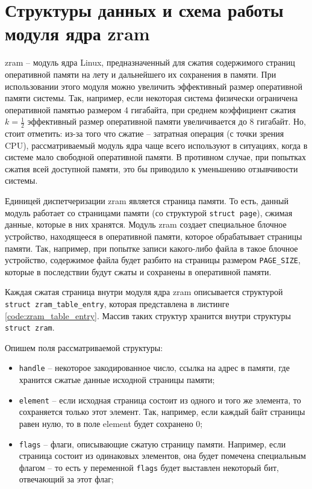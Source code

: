\documentclass[12pt, a4paper]{article}
\begin{document}
\section{Структуры данных и схема работы модуля ядра zram}

zram -- модуль ядра Linux, предназначенный для сжатия содержимого страниц оперативной памяти на лету и дальнейшего их сохранения в памяти. При использовании этого модуля можно увеличить эффективный размер оперативной памяти системы. Так, например, если некоторая система физически ограничена оперативной памятью размером 4 гигабайта, при среднем коэффициент сжатия $k = \frac{1}{2}$ эффективный размер оперативной памяти увеличивается до 8 гигабайт. Но, стоит отметить: из-за того что сжатие -- затратная операция (с точки зрения CPU), рассматриваемый модуль ядра чаще всего используют в ситуациях, когда в системе мало свободной оперативной памяти. В противном случае, при попытках сжатия всей доступной  памяти, это бы приводило к уменьшению отзывчивости системы.

Единицей диспетчеризации zram является страница памяти. То есть, данный модуль работает со страницами памяти (со структурой \texttt{struct page}), сжимая данные, которые в них хранятся. Модуль zram создает специальное блочное устройство, находящееся в оперативной памяти, которое обрабатывает страницы памяти. Так, например, при попытке записи какого-либо файла в такое блочное устройство, содержимое файла будет разбито на страницы размером \texttt{PAGE\_SIZE}, которые в последствии будут сжаты и сохранены в оперативной памяти.

Каждая сжатая страница внутри модуля ядра zram описывается структурой \texttt{struct zram\_table\_entry}, которая представлена в листинге \ref{code:zram_table_entry}. Массив таких структур хранится внутри структуры \texttt{struct zram}.


Опишем поля рассматриваемой структуры:

\begin{itemize}
	\item \texttt{handle} -- некоторое закодированное число, ссылка на адрес в памяти, где хранится сжатые данные исходной страницы памяти;
	\item \texttt{element} -- если исходная страница состоит из одного и того же элемента, то сохраняется только этот элемент. Так, например, если каждый байт страницы равен нулю, то в поле element будет сохранено 0;
	\item \texttt{flags} -- флаги, описывающие сжатую страницу памяти. Например, если страница состоит из одинаковых элементов, она будет помечена специальным флагом -- то есть у переменной \texttt{flags} будет выставлен некоторый бит, отвечающий за этот флаг;
\end{itemize}
\end{document}
